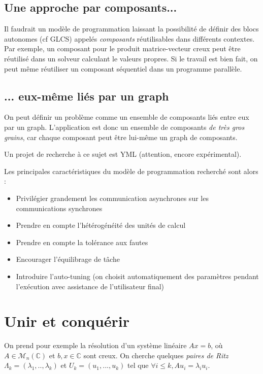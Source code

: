 \documentclass{article}
\begin{document}
\subsection{Une approche par composants...}
Il faudrait un modèle de programmation laissant la possibilité de définir des blocs autonomes (cf GLCS) appelés \emph{composants} réutilisables dans différents contextes. Par exemple, un composant pour le produit matrice-vecteur creux peut être réutilisé dans un solveur calculant le valeurs propres. Si le travail est bien fait, on peut même réutiliser un composant séquentiel dans un programme parallèle.

\subsection{... eux-même liés par un graph}
On peut définir un problème comme un ensemble de composants liés entre eux par un graph. L'application est donc un ensemble de composants \emph{de très gros grains}, car chaque composant peut être lui-même un graph de composants.

\bigskip
Un projet de recherche à ce sujet est YML (attention, encore expérimental).

\bigskip
Les principales caractéristiques du modèle de programmation recherché sont alors :
\begin{itemize}
\item Privilégier grandement les communication asynchrones sur les communications synchrones
\item Prendre en compte l'hétérogénéité des unités de calcul
\item Prendre en compte la tolérance aux fautes
\item Encourager l'équilibrage de tâche
\item Introduire l'auto-tuning (on choisit automatiquement des paramètres pendant l'exécution avec assistance de l'utilisateur final)
\end{itemize}

\section{Unir et conquérir}


On prend pour exemple la résolution d'un système linéaire $Ax=b$, où $A \in \mathcal{M}_n(\mathbb{C})$ et $b,x\in \mathbb{C}$ sont creux. On cherche quelques \emph{paires de Ritz} $\Lambda_k = (\lambda_1,..,\lambda_k)$ et $U_k = (u_1,...,u_k)$ tel que $\forall i \leq k, Au_i = \lambda_i u_i$.
\end{document}
